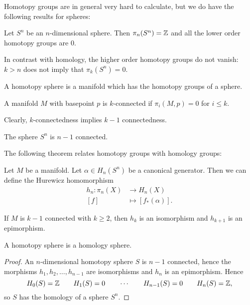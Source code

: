 Homotopy groups are in general very hard to calculate, but we do have the following results for spheres:
\begin{prop}
    Let $S^{n}$ be an $n$-dimensional sphere.
    Then $\pi_n(S^{n}) = \mathbb{Z}$ and all the lower order homotopy groups are $0$.
\end{prop}
\begin{remark}
    In contrast with homology,
    the higher order homotopy groups do not vanish:
    $k > n$ does not imply that $\pi_k(S^{n}) = 0$.
\end{remark}

\begin{definition}
    A homotopy sphere is a manifold which has the homotopy groups of a sphere.
\end{definition}

\begin{definition}[$k$-connected]
    A manifold $M$ with basepoint $p$ is $k$-connected if  $\pi_i(M, p) = 0$ for  $i \le  k$.
\end{definition}
\begin{remark}
    Clearly, $k$-connectedness implies  $k-1$ connectedness.
\end{remark}
\begin{eg}
    The sphere $S^{n}$ is $n-1$ connected.
\end{eg}

The following theorem relates homotopy groups with homology groups:
\begin{theorem}
    Let $M$ be a manifold.
    Let $\alpha \in H_n(S^{n})$ be a canonical generator.
    Then we can define the Hurewicz homomorphism
    \begin{align*}
        h_n: \pi_n(X) &\longrightarrow H_n(X) \\
        [f] &\longmapsto [f_*(\alpha)]
    .\end{align*}

    If $M$ is  $k-1$ connected with  $k\ge 2$, then $h_k$ is an isomorphism and $h_{k+1}$ is an epimorphism.
\end{theorem}

\begin{prop}
    A homotopy sphere is a homology sphere.
\end{prop}
\begin{proof}
    An $n$-dimensional homotopy sphere $S$ is $n-1$ connected, hence the morphisms $h_1, h_2, \ldots, h_{n-1}$ are isomorphisms and $h_n$ is an epimorphism.
    Hence
    \[
        H_0(S) = \mathbb{Z} \qquad
        H_1(S) = 0 \qquad 
        \cdots \qquad
        H_{n-1}(S) = 0 \qquad 
        H_{n}(S) = \mathbb{Z}
    ,\] 
    so $S$ has the homology of a sphere  $S^{n}$.
\end{proof}

